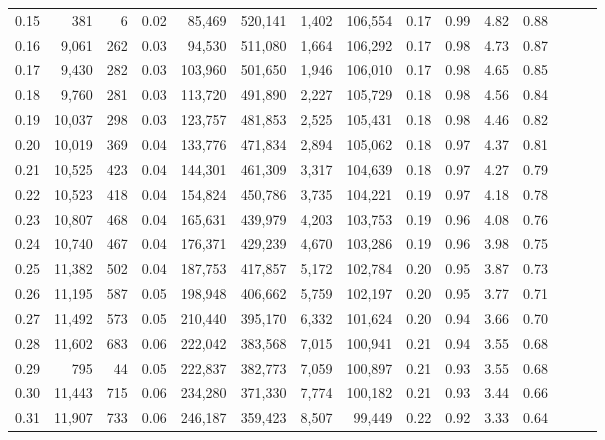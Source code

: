 \begin{tabular}{rrrrrrrrrrrrrrr}
0.15 &     381 &      6 &  0.02 &   85,469 &  520,141 &    1,402 &  106,554 &  0.17 &  0.99 &  4.82 &      0.88 \\
0.16 &   9,061 &    262 &  0.03 &   94,530 &  511,080 &    1,664 &  106,292 &  0.17 &  0.98 &  4.73 &      0.87 \\
0.17 &   9,430 &    282 &  0.03 &  103,960 &  501,650 &    1,946 &  106,010 &  0.17 &  0.98 &  4.65 &      0.85 \\
0.18 &   9,760 &    281 &  0.03 &  113,720 &  491,890 &    2,227 &  105,729 &  0.18 &  0.98 &  4.56 &      0.84 \\
0.19 &  10,037 &    298 &  0.03 &  123,757 &  481,853 &    2,525 &  105,431 &  0.18 &  0.98 &  4.46 &      0.82 \\
0.20 &  10,019 &    369 &  0.04 &  133,776 &  471,834 &    2,894 &  105,062 &  0.18 &  0.97 &  4.37 &      0.81 \\
0.21 &  10,525 &    423 &  0.04 &  144,301 &  461,309 &    3,317 &  104,639 &  0.18 &  0.97 &  4.27 &      0.79 \\
0.22 &  10,523 &    418 &  0.04 &  154,824 &  450,786 &    3,735 &  104,221 &  0.19 &  0.97 &  4.18 &      0.78 \\
0.23 &  10,807 &    468 &  0.04 &  165,631 &  439,979 &    4,203 &  103,753 &  0.19 &  0.96 &  4.08 &      0.76 \\
0.24 &  10,740 &    467 &  0.04 &  176,371 &  429,239 &    4,670 &  103,286 &  0.19 &  0.96 &  3.98 &      0.75 \\
0.25 &  11,382 &    502 &  0.04 &  187,753 &  417,857 &    5,172 &  102,784 &  0.20 &  0.95 &  3.87 &      0.73 \\
0.26 &  11,195 &    587 &  0.05 &  198,948 &  406,662 &    5,759 &  102,197 &  0.20 &  0.95 &  3.77 &      0.71 \\
0.27 &  11,492 &    573 &  0.05 &  210,440 &  395,170 &    6,332 &  101,624 &  0.20 &  0.94 &  3.66 &      0.70 \\
0.28 &  11,602 &    683 &  0.06 &  222,042 &  383,568 &    7,015 &  100,941 &  0.21 &  0.94 &  3.55 &      0.68 \\
0.29 &     795 &     44 &  0.05 &  222,837 &  382,773 &    7,059 &  100,897 &  0.21 &  0.93 &  3.55 &      0.68 \\
0.30 &  11,443 &    715 &  0.06 &  234,280 &  371,330 &    7,774 &  100,182 &  0.21 &  0.93 &  3.44 &      0.66 \\
0.31 &  11,907 &    733 &  0.06 &  246,187 &  359,423 &    8,507 &   99,449 &  0.22 &  0.92 &  3.33 &      0.64 \\

\end{tabular}
